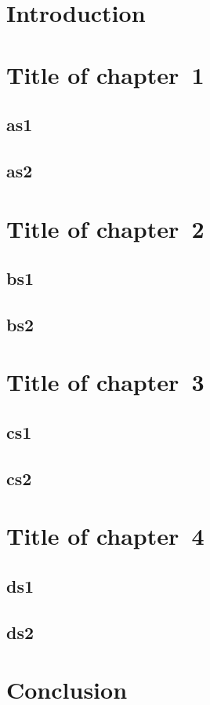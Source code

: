 \documentclass[a4paper]{report}
\begin{document}
\dominitoc \tableofcontents
\chapter*{Introduction}
\mtcaddchapter[Introduction]
\chapter{Title of chapter~1}
\minitoc
\section{as1} \section{as2}
\chapter{Title of chapter~2}
\minitoc
\section{bs1} \section{bs2}
\chapter{Title of chapter~3}
\minitoc
\section{cs1} \section{cs2}
\chapter{Title of chapter~4}
\minitoc
\section{ds1} \section{ds2}
\chapter*{Conclusion}
\mtcaddchapter[Conclusion]
\end{document}
